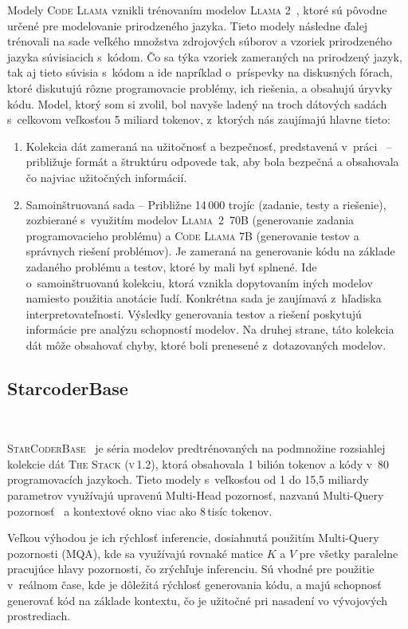 Modely \textsc{Code Llama} vznikli trénovaním modelov \textsc{Llama 2}~\cite{touvron2023llama}, ktoré sú pôvodne určené pre modelovanie prirodzeného jazyka. Tieto modely následne ďalej trénovali na sade veľkého množstva zdrojových súborov a vzoriek prirodzeného jazyka súvisiacich s~kódom. Čo sa týka vzoriek zameraných na prirodzený jazyk, tak aj tieto súvisia s~kódom a ide napríklad o~príspevky na diskusných fórach, ktoré diskutujú rôzne programovacie problémy, ich riešenia, a obsahujú úryvky kódu. Model, ktorý som si zvolil, bol navyše ladený na troch dátových sadách s~celkovom veľkosťou 5 miliard tokenov, z~ktorých nás zaujímajú hlavne tieto:
\begin{enumerate}
        \item Kolekcia dát zameraná na užitočnosť a bezpečnosť, predstavená v~práci~\cite{touvron2023llama} -- približuje formát a štruktúru odpovede tak, aby bola bezpečná a obsahovala čo najviac užitočných informácií.
        \item Samoinštruovaná sada -- Približne 14\,000 trojíc (zadanie, testy a riešenie), zozbierané s~využitím modelov \textsc{Llama~2~70B} (generovanie zadania programovacieho problému) a \textsc{Code Llama 7B} (generovanie testov a správnych riešení problémov). Je zameraná na generovanie kódu na základe zadaného problému a testov, ktoré by mali byť splnené. Ide o~samoinštruovanú kolekciu, ktorá vznikla dopytovaním iných modelov namiesto použitia anotácie ľudí. Konkrétna sada je zaujímavá z~hľadiska interpretovateľnosti. Výsledky generovania testov a riešení poskytujú informácie pre analýzu schopností modelov. Na druhej strane, táto kolekcia dát môže obsahovať chyby, ktoré boli prenesené z~dotazovaných modelov.
\end{enumerate}

\newpage
\subsection{StarcoderBase}~\label{sec:starcoder}

\noindent\textsc{StarCoderBase}~\cite{li2023starcoder} je séria modelov predtrénovaných na podmnožine rozsiahlej kolekcie dát \textsc{The Stack (v\,1.2)}, ktorá obsahovala 1 bilión tokenov a kódy v~80 programovacích jazykoch. Tieto modely s~veľkosťou od 1 do 15,5 miliardy parametrov využívajú upravenú Multi-Head pozornosť, nazvanú Multi-Query pozornosť~\cite{shazeer2019fast} a kontextové okno viac ako 8\,tisíc tokenov.

Veľkou výhodou je ich rýchlosť inferencie, dosiahnutá použitím Multi-Query pozornosti (MQA), kde sa využívajú rovnaké matice $K$ a $V$ pre všetky paralelne pracujúce hlavy pozornosti, čo zrýchľuje inferenciu. Sú vhodné pre použitie v~reálnom čase, kde je dôležitá rýchlosť generovania kódu, a majú schopnosť generovať kód na základe kontextu, čo je užitočné pri nasadení vo vývojových prostrediach.

